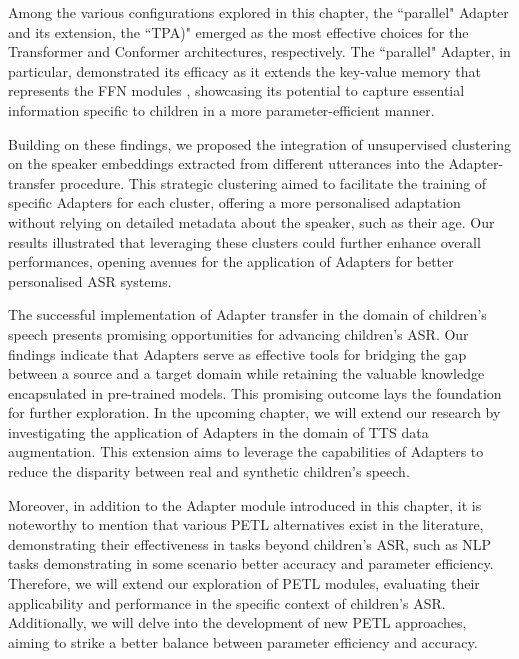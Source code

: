 Among the various configurations explored in this chapter, the ``parallel" Adapter and its extension, the ``\ac{TPA})" emerged as the most effective choices for the Transformer and Conformer architectures, respectively. The ``parallel" Adapter, in particular, demonstrated its efficacy as it extends the key-value memory that represents the \ac{FFN} modules \cite{geva2020transformer}, showcasing its potential to capture essential information specific to children in a more parameter-efficient manner.

Building on these findings, we proposed the integration of unsupervised clustering on the speaker embeddings extracted from different utterances into the Adapter-transfer procedure. This strategic clustering aimed to facilitate the training of specific Adapters for each cluster, offering a more personalised adaptation without relying on detailed metadata about the speaker, such as their age. Our results illustrated that leveraging these clusters could further enhance overall performances, opening avenues for the application of Adapters for better personalised \ac{ASR} systems.


The successful implementation of Adapter transfer in the domain of children's speech presents promising opportunities for advancing children's \ac{ASR}. Our findings indicate that Adapters serve as effective tools for bridging the gap between a source and a target domain while retaining the valuable knowledge encapsulated in pre-trained models. This promising outcome lays the foundation for further exploration. In the upcoming chapter, we will extend our research by investigating the application of Adapters in the domain of \ac{TTS} data augmentation. This extension aims to leverage the capabilities of Adapters to reduce the disparity between real and synthetic children's speech.

Moreover, in addition to the Adapter module introduced in this chapter, it is noteworthy to mention that various \ac{PETL} alternatives exist in the literature, demonstrating their effectiveness in tasks beyond children's \ac{ASR}, such as \ac{NLP} tasks demonstrating in some scenario better accuracy and parameter efficiency. Therefore, we will extend our exploration of \ac{PETL} modules, evaluating their applicability and performance in the specific context of children's \ac{ASR}. Additionally, we will delve into the development of new \ac{PETL} approaches, aiming to strike a better balance between parameter efficiency and accuracy. 


